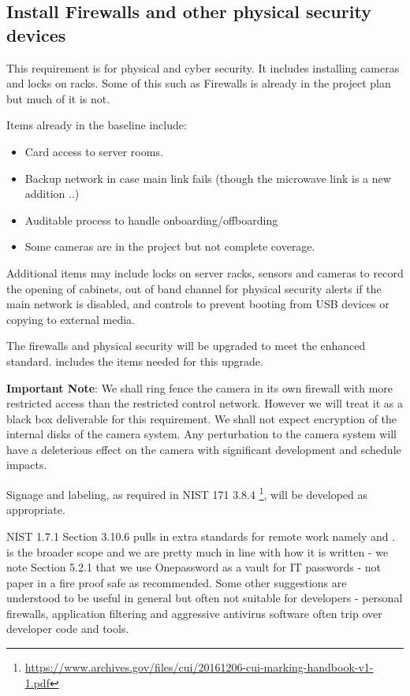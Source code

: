 
\subsection{Install Firewalls and other physical security devices} \label{sec:2firewalls}

This requirement is for physical and cyber security. It includes installing cameras and locks on racks.
Some of this such as Firewalls is already in the project plan but much of it is not.

Items already in the baseline include:
\begin{itemize}
\item Card access to server rooms.
\item Backup network in case main link fails (though the microwave link is a new addition ..)
\item Auditable process to handle onboarding/offboarding
\item Some cameras are in the project but not complete coverage.

\end{itemize}

Additional items may include locks on server racks, sensors and cameras to record the opening of  cabinets, out of band channel for physical security alerts if the main network is disabled, and controls to  prevent booting from USB devices or copying to external media.

The firewalls and physical security will be upgraded to meet the enhanced standard.  includes the items needed for this upgrade.

{\bf Important Note}: We shall ring fence the \gls{camera} in its own firewall with more restricted access than the restricted control network.
However we will treat it as a black box deliverable for this requirement. We shall not expect encryption of the internal disks of the \gls{camera} system. Any perturbation to the \gls{camera} system will have a deleterious effect on the \gls{camera} with significant development and schedule impacts.

Signage and labeling, as required in \gls{NIST} 171 3.8.4 \footnote{\url{https://www.archives.gov/files/cui/20161206-cui-marking-handbook-v1-1.pdf}}, will be developed as appropriate.

NIST 1.7.1 Section 3.10.6 pulls in extra standards for remote work namely  and .
 is the broader scope and we are pretty much in line with how it is written - we note Section 5.2.1 that we use Onepassword as a vault for \gls{IT} passwords - not paper in a fire proof safe as recommended.
Some other suggestions are understood to be useful in general but often not suitable for developers - personal firewalls, application filtering  and aggressive antivirus \gls{software} often trip over developer code and tools.

